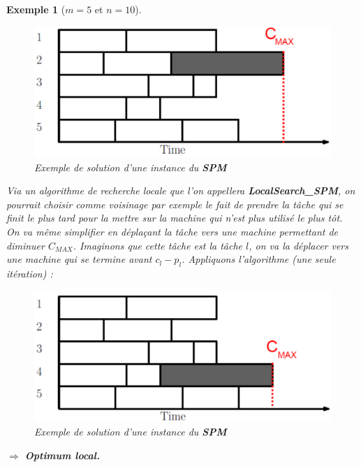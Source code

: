 \documentclass[12pt]{article}
\newcommand{\titre}[1]{\textcolor{title}{#1}}
\newtheorem{exemple}{Exemple}[section]
\begin{document}
\begin{exemple}[$m=5$ et $n=10$]$ $\\
\begin{figure}[h!]
    \begin{center}
    \includegraphics[scale=0.5]{spm1.pdf}
    \caption{Exemple de solution d'une instance du \textbf{\titre{SPM}}}
    \end{center}
\end{figure}

Via un algorithme de recherche locale que l'on appellera \textbf{LocalSearch\_SPM}, on pourrait choisir comme voisinage par exemple le
fait de prendre la tâche qui se finit le plus tard pour la mettre sur la machine qui n'est plus utilisé le plus tôt. On va même
simplifier en déplaçant la tâche vers une machine permettant de diminuer $C_{MAX}$. Imaginons que cette tâche est la tâche $l$, on va la
déplacer vers une machine qui se termine avant $c_l-p_l$. Appliquons l'algorithme (une seule itération) :

\begin{figure}[h!]
    \begin{center}
    \includegraphics[scale=0.5]{spm2.pdf}
    \caption{Exemple de solution d'une instance du \textbf{\titre{SPM}}}
    \end{center}
\end{figure}

$\Longrightarrow$ \textbf{Optimum local.}
\end{exemple}
\end{document}
